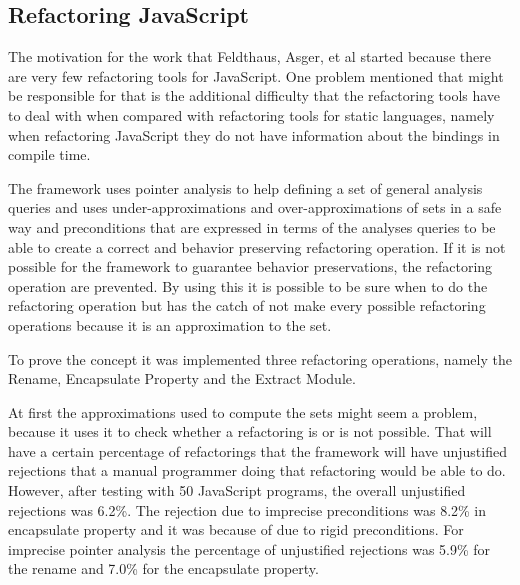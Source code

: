 \subsection{Refactoring JavaScript}

The motivation for the work that Feldthaus, Asger, et al \cite{feldthaus2011tool} started because there are very few refactoring tools for JavaScript. One problem mentioned that might be responsible for that is the additional difficulty that the refactoring tools have to deal with when compared with refactoring tools for static languages, namely when refactoring JavaScript they do not have information about the bindings in compile time.



The framework uses pointer analysis to help defining a set of general analysis queries and uses under-approximations and over-approximations of sets in a safe way and preconditions that are expressed in terms of the analyses queries to be able to create a correct and behavior preserving refactoring operation. If it is not possible for the framework to guarantee behavior preservations, the refactoring operation are prevented.
By using this it is possible to be sure when to do the refactoring operation but has the catch of not make every possible refactoring operations because it is an approximation to the set.

To prove the concept it was implemented three refactoring operations, namely the Rename, Encapsulate Property and the Extract Module.

At first the approximations used to compute the sets might seem a problem, because it uses it to check whether a refactoring is or is not possible. That will have a certain percentage of refactorings that the framework will have unjustified rejections that a manual programmer doing that refactoring would be able to do. However, after testing with 50 JavaScript programs, the overall unjustified rejections was 6.2\%. The rejection due to imprecise preconditions was 8.2\% in encapsulate property and it was because of due to rigid preconditions. For imprecise pointer analysis the percentage of unjustified rejections was 5.9\% for the rename and 7.0\% for the encapsulate property. 
